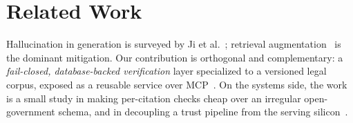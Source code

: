 \section{Related Work}
\label{sec:related}

Hallucination in generation is surveyed by Ji et al.~\cite{ji2023hallucination};
retrieval augmentation~\cite{lewis2020rag} is the dominant mitigation. Our
contribution is orthogonal and complementary: a \emph{fail-closed, database-backed
verification} layer specialized to a versioned legal corpus, exposed as a
reusable service over MCP~\cite{mcp2024}. On the systems side, the work is a
small study in making per-citation checks cheap over an irregular open-government
schema, and in decoupling a trust pipeline from the serving
silicon~\cite{modularmax2024, qualcommcloudai100}.
